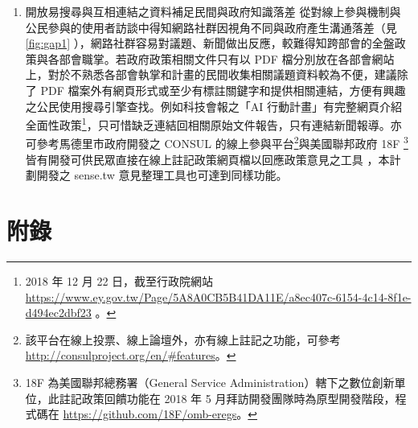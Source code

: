 \documentclass[12pt,a4paper]{article}
\begin{document}
\begin{enumerate}
\item 開放易搜尋與互相連結之資料補足民間與政府知識落差
\label{sec:org7edb381}
從對線上參與機制與公民參與的使用者訪談中得知網路社群因視角不同與政府產生溝通落差（見 \ref{fig:gap1} ），網路社群容易對議題、新聞做出反應，較難得知跨部會的全盤政策與各部會職掌。若政府政策相關文件只有以 PDF 檔分別放在各部會網站上，對於不熟悉各部會執掌和計畫的民間收集相關議題資料較為不便，建議除了 PDF 檔案外有網頁形式或至少有標註關鍵字和提供相關連結，方便有興趣之公民使用搜尋引擎查找。例如科技會報之「AI 行動計畫」有完整網頁介紹全面性政策\footnote{2018 年 12 月 22 日，截至行政院網站 \url{https://www.ey.gov.tw/Page/5A8A0CB5B41DA11E/a8ec407c-6154-4c14-8f1e-d494ec2dbf23} 。}，只可惜缺乏連結回相關原始文件報告，只有連結新聞報導。亦可參考馬德里市政府開發之 CONSUL 的線上參與平台\footnote{該平台在線上投票、線上論壇外，亦有線上註記之功能，可參考 \url{http://consulproject.org/en/\#features}。}與美國聯邦政府 18F \footnote{18F 為美國聯邦總務署（General Service Administration）轄下之數位創新單位，此註記政策回饋功能在 2018 年 5 月拜訪開發團隊時為原型開發階段，程式碼在 \url{https://github.com/18F/omb-eregs}。}皆有開發可供民眾直接在線上註記政策網頁檔以回應政策意見之工具
，本計劃開發之 sense.tw 意見整理工具也可達到同樣功能。
\end{enumerate}
\section{附錄}
\label{sec:orgcdeedd3}
\end{document}

